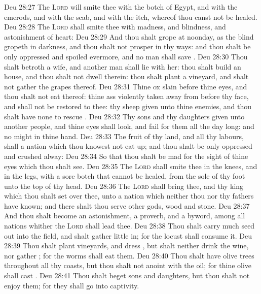\vs Deu 28:27 The \textsc{Lord} will smite thee with the botch of Egypt, and with the emerods, and with the scab, and with the itch, whereof thou canst not be healed.
\vs Deu 28:28 The \textsc{Lord} shall smite thee with madness, and blindness, and astonishment of heart:
\vs Deu 28:29 And thou shalt grope at noonday, as the blind gropeth in darkness, and thou shalt not prosper in thy ways: and thou shalt be only oppressed and spoiled evermore, and no man shall save .
\vs Deu 28:30 Thou shalt betroth a wife, and another man shall lie with her: thou shalt build an house, and thou shalt not dwell therein: thou shalt plant a vineyard, and shalt not gather the grapes thereof.
\vs Deu 28:31 Thine ox  slain before thine eyes, and thou shalt not eat thereof: thine ass  violently taken away from before thy face, and shall not be restored to thee: thy sheep  given unto thine enemies, and thou shalt have none to rescue .
\vs Deu 28:32 Thy sons and thy daughters  given unto another people, and thine eyes shall look, and fail  for them all the day long: and  no might in thine hand.
\vs Deu 28:33 The fruit of thy land, and all thy labours, shall a nation which thou knowest not eat up; and thou shalt be only oppressed and crushed alway:
\vs Deu 28:34 So that thou shalt be mad for the sight of thine eyes which thou shalt see.
\vs Deu 28:35 The \textsc{Lord} shall smite thee in the knees, and in the legs, with a sore botch that cannot be healed, from the sole of thy foot unto the top of thy head.
\vs Deu 28:36 The \textsc{Lord} shall bring thee, and thy king which thou shalt set over thee, unto a nation which neither thou nor thy fathers have known; and there shalt thou serve other gods, wood and stone.
\vs Deu 28:37 And thou shalt become an astonishment, a proverb, and a byword, among all nations whither the \textsc{Lord} shall lead thee.
\vs Deu 28:38 Thou shalt carry much seed out into the field, and shalt gather  little in; for the locust shall consume it.
\vs Deu 28:39 Thou shalt plant vineyards, and dress , but shalt neither drink  the wine, nor gather ; for the worms shall eat them.
\vs Deu 28:40 Thou shalt have olive trees throughout all thy coasts, but thou shalt not anoint  with the oil; for thine olive shall cast .
\vs Deu 28:41 Thou shalt beget sons and daughters, but thou shalt not enjoy them; for they shall go into captivity.
